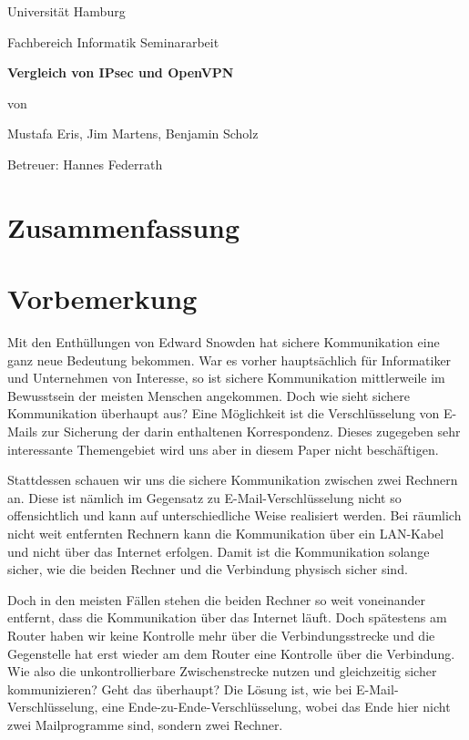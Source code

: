 \documentclass[12pt]{scrartcl}
\begin{document}

\newpage
\thispagestyle{empty}
\begin{center}\Large
Universität Hamburg \par
Fachbereich Informatik
\vfill
Seminararbeit
\vfill
{\Large\textsf{\textbf{Vergleich von IPsec und OpenVPN}}\par}
\vfill
von 
\par\bigskip
Mustafa Eris, Jim Martens, Benjamin Scholz \par
Betreuer: Hannes Federrath \par
\end{center}

\newpage
\section*{Zusammenfassung}


\newpage
\tableofcontents

\newpage
\section{Vorbemerkung}
Mit den Enthüllungen von Edward Snowden hat sichere Kommunikation eine ganz neue Bedeutung bekommen. War es vorher hauptsächlich für Informatiker und Unternehmen von Interesse, so ist sichere Kommunikation mittlerweile im Bewusstsein der meisten Menschen angekommen. Doch wie sieht sichere Kommunikation überhaupt aus? Eine Möglichkeit ist die Verschlüsselung von E-Mails zur Sicherung der darin enthaltenen Korrespondenz. Dieses zugegeben sehr interessante Themengebiet wird uns aber in diesem Paper nicht beschäftigen. 

Stattdessen schauen wir uns die sichere Kommunikation zwischen zwei Rechnern an. Diese ist nämlich im Gegensatz zu E-Mail-Verschlüsselung nicht so offensichtlich und kann auf unterschiedliche Weise realisiert werden. Bei räumlich nicht weit entfernten Rechnern kann die Kommunikation über ein LAN-Kabel und nicht über das Internet erfolgen. Damit ist die Kommunikation solange sicher, wie die beiden Rechner und die Verbindung physisch sicher sind. 

Doch in den meisten Fällen stehen die beiden Rechner so weit voneinander entfernt, dass die Kommunikation über das Internet läuft. Doch spätestens am Router haben wir keine Kontrolle mehr über die Verbindungsstrecke und die Gegenstelle hat erst wieder am dem Router eine Kontrolle über die Verbindung. Wie also die unkontrollierbare Zwischenstrecke nutzen und gleichzeitig sicher kommunizieren? Geht das überhaupt? Die Lösung ist, wie bei E-Mail-Verschlüsselung, eine Ende-zu-Ende-Verschlüsselung, wobei das Ende hier nicht zwei Mailprogramme sind, sondern zwei Rechner.
\end{document}
